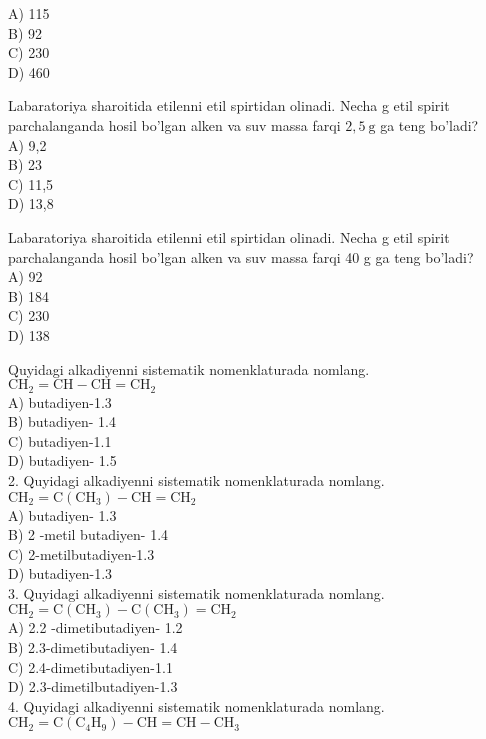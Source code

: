 A) 115\\
B) 92\\
C) 230\\
D) 460
  \item Labaratoriya sharoitida etilenni etil spirtidan olinadi. Necha g etil spirit parchalanganda hosil bo'lgan alken va suv massa farqi $2,5 \mathrm{~g}$ ga teng bo'ladi?\\
A) 9,2\\
B) 23\\
C) 11,5\\
D) 13,8
  \item Labaratoriya sharoitida etilenni etil spirtidan olinadi. Necha g etil spirit parchalanganda hosil bo'lgan alken va suv massa farqi 40 g ga teng bo'ladi?\\
A) 92\\
B) 184\\
C) 230\\
D) 138
  \item Quyidagi alkadiyenni sistematik nomenklaturada nomlang.\\
$\mathrm{CH}_{2}=\mathrm{CH}-\mathrm{CH}=\mathrm{CH}_{2}$\\
A) butadiyen-1.3\\
B) butadiyen- 1.4\\
C) butadiyen-1.1\\
D) butadiyen- 1.5\\
2. Quyidagi alkadiyenni sistematik nomenklaturada nomlang.\\
$\mathrm{CH}_{2}=\mathrm{C}\left(\mathrm{CH}_{3}\right)-\mathrm{CH}=\mathrm{CH}_{2}$\\
A) butadiyen- 1.3\\
B) 2 -metil butadiyen- 1.4\\
C) 2-metilbutadiyen-1.3\\
D) butadiyen-1.3\\
3. Quyidagi alkadiyenni sistematik nomenklaturada nomlang.\\
$\mathrm{CH}_{2}=\mathrm{C}\left(\mathrm{CH}_{3}\right)-\mathrm{C}\left(\mathrm{CH}_{3}\right)=\mathrm{CH}_{2}$\\
A) 2.2 -dimetibutadiyen- 1.2\\
B) 2.3-dimetibutadiyen- 1.4\\
C) 2.4-dimetibutadiyen-1.1\\
D) 2.3-dimetilbutadiyen-1.3\\
4. Quyidagi alkadiyenni sistematik nomenklaturada nomlang.\\
$\mathrm{CH}_{2}=\mathrm{C}\left(\mathrm{C}_{4} \mathrm{H}_{9}\right)-\mathrm{CH}=\mathrm{CH}-\mathrm{CH}_{3}$\\
